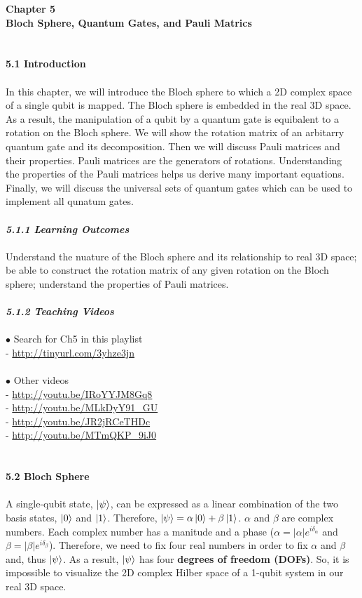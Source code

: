 \documentclass{article}
\newcommand{\bfit}[1]{\textit{\textbf{#1}}}
\begin{document}
\textbf{\Large Chapter 5\\ Bloch Sphere, Quantum Gates, and Pauli Matrics}
\\\\\\
\textbf{\large 5.1 Introduction}\\\\
In this chapter, we will introduce the Bloch sphere to which a 2D complex
space of a single qubit is mapped. The Bloch sphere is embedded in the real 
3D space. As a result, the manipulation of a qubit by a quantum gate is equibalent to a rotation on the
Bloch sphere. We will show the rotation matrix of an arbitarry quantum
gate and its decomposition. Then we will discuss Pauli matrices and their properties.
Pauli matrices are the generators of rotations. Understanding the properties of the
Pauli matrices helps us derive many important equations. Finally, we will discuss
the universal sets of quantum gates which can be used to implement all qunatum gates.
\\\\
\bfit{\large 5.1.1 Learning Outcomes}
\\\\
Understand the nuature of the Bloch sphere and its relationship to real 3D space;
be able to construct the rotation matrix of any given rotation on the Bloch sphere;
understand the properties of Pauli matrices.\\\\
\bfit{\large 5.1.2 Teaching Videos}\\\\
$\bullet$ Search for Ch5 in this playlist\\
- \url{http://tinyurl.com/3yhze3jn}\\\\
$\bullet$ Other videos\\
- \url{http://youtu.be/IRoYYJM8Gq8}\\
- \url{http://youtu.be/MLkDyY91_GU}\\
- \url{http://youtu.be/JR2jRCeTHDc}\\
- \url{http://youtu.be/MTmQKP_9iJ0}\\
\\\\
\textbf{\large 5.2 Bloch Sphere}\\\\
A single-qubit state, $\ket{\psi}$, can be expressed as a linear combination of the two basis
states, $\ket{0}$ and $\ket{1}$. Therefore, $\ket{\psi}=\alpha\ket{0}+\beta\ket{1}$. $\alpha$ and $\beta$ are complex numbers.
Each complex number has a manitude and a phase ($\alpha=|\alpha|e^{i\delta_{\alpha}}$ and $\beta=|\beta|e^{i\delta_{\beta}}$).
Therefore, we need to fix four real numbers in order to fix $\alpha$ and $\beta$ and, thus $\ket{\psi}$.
As a result, $\ket{\psi}$ has four \textbf{degrees of freedom (DOFs)}. So, it is impossible to
visualize the 2D complex Hilber space of a 1-qubit system in our real 3D space.
\end{document}
